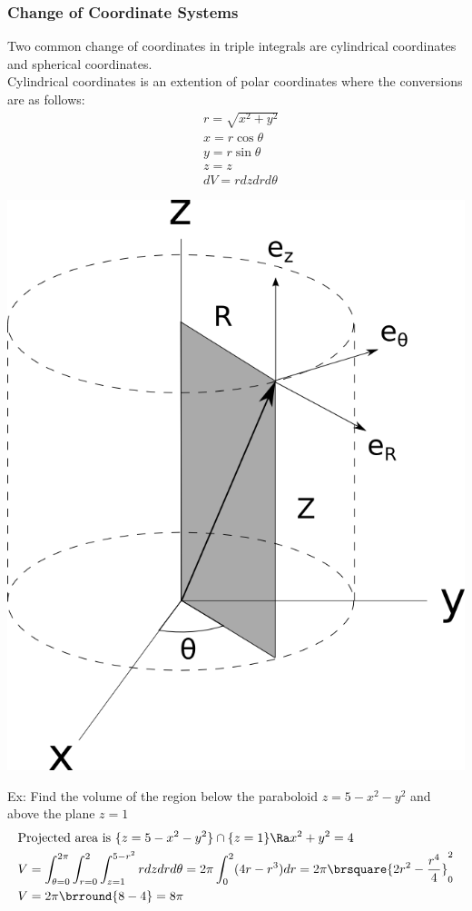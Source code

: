 \subsubsection{Change of Coordinate Systems}
Two common change of coordinates in triple integrals are cylindrical coordinates and spherical coordinates.\\
Cylindrical coordinates is an extention of polar coordinates where the conversions are as follows:
\begin{align*}
    &r=\sqrt{x^2+y^2}\\
    &x=r\cos\theta\\
    &y=r\sin\theta\\
    &z=z\\
    &dV=rdzdrd\theta
\end{align*}
\centerline{\includegraphics[scale=0.3]{Images/Math217Pictures/cylindricalCoordinates.png}}
Ex: Find the volume of the region below the paraboloid $z=5-x^2-y^2$ and above the plane $z=1$
\begin{align*}
    &\text{Projected area is }\{z=5-x^2-y^2\}\cap\{z=1\}\Ra x^2+y^2=4\\
    &V=\int_{\theta=0}^{2\pi}\int_{r=0}^2\int_{z=1}^{5-r^2}rdzdrd\theta=2\pi\int_0^2 (4r-r^3)dr=2\pi\brsquare{2r^2-\frac{r^4}{4}}_0^2\\
    &V=2\pi\brround{8-4}=8\pi
\end{align*}

